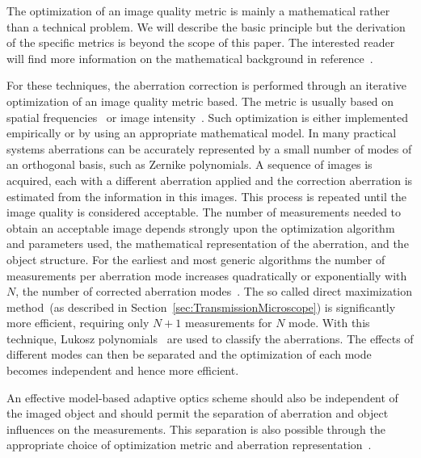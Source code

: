 
The optimization of an image quality metric is mainly a mathematical rather than a technical problem. We will describe the basic principle but the derivation of the specific metrics is beyond the scope of this paper. The interested reader will find more information on the mathematical background in reference~\cite{wide_parabolic_optimization,wide_sphere_packing,wide_Lukosz_Modes,wide_AOM_loew_freq}. 

For these techniques, the aberration correction is performed through an iterative optimization of an image quality metric based. The metric is usually based on spatial frequencies~\cite{wide_AOM_loew_freq} or image intensity~\cite{indirect_metric_intensity}. Such optimization is either implemented empirically or by using an appropriate mathematical model. In many practical systems aberrations can be accurately represented by a small number of modes of an orthogonal basis, such as Zernike polynomials. A sequence of images is acquired, each with a different aberration applied and the correction aberration is estimated from the information in this images. This process is repeated until the image quality is considered acceptable. The number of measurements needed to obtain an acceptable image depends strongly upon the optimization algorithm and parameters used, the mathematical representation of the aberration, and the object structure. For the earliest and most generic algorithms the number of measurements per aberration mode increases quadratically or exponentially with $N$, the number of corrected aberration modes~\cite{wide_sphere_packing}. The so called direct maximization method~(as described in Section~\ref{sec:TransmissionMicroscope}) is significantly more efficient, requiring only $N+1$ measurements for $N$ mode. With this technique, Lukosz polynomials~\cite{wide_Lukosz_Modes} are used to classify the aberrations. The effects of different modes can then be separated and the optimization of each mode becomes independent and hence more efficient.

An effective model-based adaptive optics scheme should also be independent of the imaged object and should permit the separation of aberration and object influences on the measurements. This separation is also possible through the appropriate choice of optimization metric and aberration representation~\cite{wide_AOM_loew_freq}.


